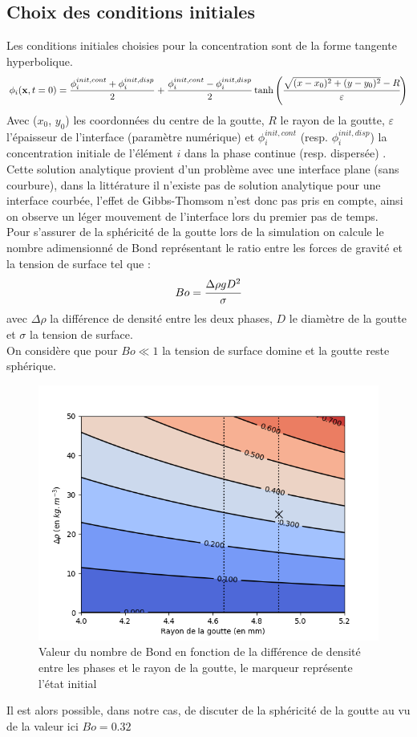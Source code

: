 \subsection{Choix des conditions initiales}
Les conditions initiales choisies pour la concentration sont de la forme tangente hyperbolique.
\begin{equation}
	\phi_{i}(\mathbf{x},t=0) = \frac{\phi^{init,cont}_i + \phi^{init,disp}_i  }{2} +  \frac{\phi^{init,cont}_i - \phi^{init,disp}_i }{2}\tanh\left(\cfrac{\sqrt{(x-x_0)^2+(y-y_0)^2}-R}{\varepsilon} \right)
\end{equation}
Avec ($x_0$, $y_0$) les coordonnées du centre de la goutte, $R$ le rayon de la goutte, $\varepsilon$ l'épaisseur de l'interface (paramètre numérique) et $\phi_i^{init,cont}$ (resp. $\phi_i^{init,disp}$) la concentration initiale de l'élément $i$ dans la phase continue (resp. dispersée) .\\
Cette solution analytique provient d'un problème avec une interface plane (sans courbure), dans la littérature il n'existe pas de solution analytique pour une interface courbée, l'effet de Gibbs-Thomsom n'est donc pas pris en compte, ainsi on observe un léger mouvement de l'interface lors du premier pas de temps. \\
Pour s'assurer de la sphéricité de la goutte lors de la simulation on calcule le nombre adimensionné de Bond  représentant le ratio entre les forces de gravité et la tension de surface tel que :
\begin{equation}
	Bo = \cfrac{\Delta \rho g D^2}{\sigma}
\end{equation}
avec $\Delta\rho$ la différence de densité entre les deux phases, $D$ le diamètre de la goutte et $\sigma$ la tension de surface.\\
On considère que pour $Bo \ll 1$ la tension de surface domine et la goutte reste sphérique.
\begin{figure}[H]
	\centering
	\includegraphics[width=0.7\linewidth]{figure/contour_bond}
	\caption[Valeur du nombre de Bond en fonction de la différence de densité et de la tension de surface entre les phases]{Valeur du nombre de Bond en fonction de la différence de densité entre les phases et le rayon de la goutte, le marqueur représente l'état initial}
	\label{fig:contourbond}
\end{figure}
Il est alors possible, dans notre cas, de discuter de la sphéricité de la goutte au vu de la valeur ici $Bo = 0.32$
